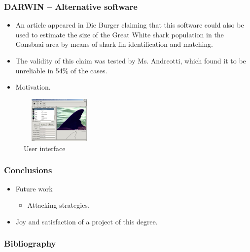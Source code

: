 \documentclass{beamer}
\newcommand{\myitem}{\item[$-$]}
\begin{document}
\begin{frame}
\frametitle{DARWIN -- Alternative software}
\begin{itemize}
 \item An article\cite{Darwin} appeared in Die Burger claiming that this
 software could also be used to estimate the size of the Great White shark
 population in the Gansbaai area by means of shark fin identification and
 matching.
 \item The validity of this claim was tested by Ms. Andreotti, which found it to
 be unreliable in 54\% of the cases.
 \item Motivation.
\end{itemize}
\begin{figure}
 \centering
 \includegraphics[width=1.5in, height=0.9in]{Darwin.jpg}
 \caption{User interface}
\end{figure}
\end{frame}


\begin{frame}
\frametitle{Conclusions}
\begin{itemize}
\item Future work
\begin{itemize}
 \myitem Attacking strategies.
\end{itemize}
\item Joy and satisfaction of a project of this degree.
\end{itemize}
\end{frame}


\begin{frame}
\frametitle{Bibliography}


\end{frame}
\end{document}
